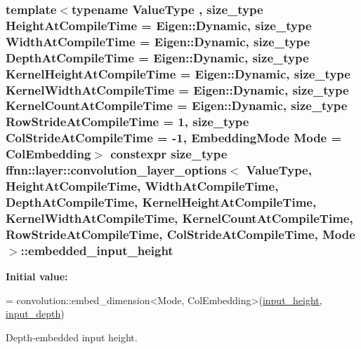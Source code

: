 \hypertarget{structffnn_1_1layer_1_1convolution__layer__options_adbb07df9a83a76fecd9edb9666a8bbc6}{
\subsubsection[{embedded\-\_\-input\-\_\-height}]{\setlength{\rightskip}{0pt plus 5cm}template$<$typename Value\-Type , size\-\_\-type Height\-At\-Compile\-Time = Eigen\-::\-Dynamic, size\-\_\-type Width\-At\-Compile\-Time = Eigen\-::\-Dynamic, size\-\_\-type Depth\-At\-Compile\-Time = Eigen\-::\-Dynamic, size\-\_\-type Kernel\-Height\-At\-Compile\-Time = Eigen\-::\-Dynamic, size\-\_\-type Kernel\-Width\-At\-Compile\-Time = Eigen\-::\-Dynamic, size\-\_\-type Kernel\-Count\-At\-Compile\-Time = Eigen\-::\-Dynamic, size\-\_\-type Row\-Stride\-At\-Compile\-Time = 1, size\-\_\-type Col\-Stride\-At\-Compile\-Time = -\/1, Embedding\-Mode Mode = Col\-Embedding$>$ constexpr {\bf size\-\_\-type} {\bf ffnn\-::layer\-::convolution\-\_\-layer\-\_\-options}$<$ Value\-Type, Height\-At\-Compile\-Time, Width\-At\-Compile\-Time, Depth\-At\-Compile\-Time, Kernel\-Height\-At\-Compile\-Time, Kernel\-Width\-At\-Compile\-Time, Kernel\-Count\-At\-Compile\-Time, Row\-Stride\-At\-Compile\-Time, Col\-Stride\-At\-Compile\-Time, Mode $>$\-::embedded\-\_\-input\-\_\-height\hspace{0.3cm}{\ttfamily [static]}}}\label{structffnn_1_1layer_1_1convolution__layer__options_adbb07df9a83a76fecd9edb9666a8bbc6}
{\bfseries Initial value\-:}
\begin{DoxyCode}
=
    convolution::embed\_dimension<Mode, ColEmbedding>(\hyperlink{structffnn_1_1layer_1_1convolution__layer__options_a9bbe1f21e099830ff076e893842d80ef}{input\_height}, 
      \hyperlink{structffnn_1_1layer_1_1convolution__layer__options_ae4d23d286d13ecb3a1127bcf34569137}{input\_depth})
\end{DoxyCode}


Depth-\/embedded input height. 

